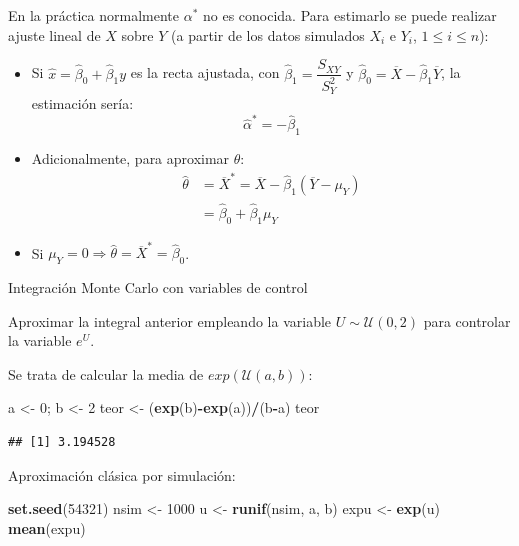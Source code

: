 \documentclass[]{book}
\newenvironment{Shaded}{\begin{snugshade}}{\end{snugshade}}
\newcommand{\KeywordTok}[1]{\textcolor[rgb]{0.13,0.29,0.53}{\textbf{#1}}}
\newcommand{\DecValTok}[1]{\textcolor[rgb]{0.00,0.00,0.81}{#1}}
\newcommand{\StringTok}[1]{\textcolor[rgb]{0.31,0.60,0.02}{#1}}
\newcommand{\OperatorTok}[1]{\textcolor[rgb]{0.81,0.36,0.00}{\textbf{#1}}}
\newcommand{\NormalTok}[1]{#1}
\theoremstyle{definition}
\theoremstyle{definition}
\theoremstyle{definition}
\theoremstyle{remark}
\let\BeginKnitrBlock\begin \let\EndKnitrBlock\end
\begin{document}
En la práctica normalmente \(\alpha^{\ast}\) no es conocida. Para
estimarlo se puede realizar ajuste lineal de \(X\) sobre \(Y\) (a partir
de los datos simulados \(X_{i}\) e \(Y_{i}\), \(1\leq i\leq n\)):

\begin{itemize}
\item
  Si \(\hat{x}=\hat{\beta}_{0}+\hat{\beta}_{1}y\) es la recta ajustada,
  con \(\hat{\beta}_{1} = \dfrac{S_{XY}}{S_{Y}^{2}}\) y
  \(\hat{\beta}_{0} = \overline{X}-\hat{\beta}_{1}\overline{Y}\), la
  estimación sería: \[\hat{\alpha}^{\ast}=-\hat{\beta}_{1}\]
\item
  Adicionalmente, para aproximar \(\theta\): \[\begin{aligned}
  \hat{\theta} & =\overline{X}^{\ast}=\overline{X}-\hat{\beta}_{1}\left( \overline{Y}-\mu_{Y}\right) \\  
  & =\hat{\beta}_{0}+\hat{\beta}_{1}\mu_{Y}
  \end{aligned}\]
\item
  Si
  \(\mu_{Y}=0\Rightarrow \hat{\theta}=\overline{X}^{\ast}=\hat{\beta}_{0}\).
\end{itemize}

\BeginKnitrBlock{exercise}
\protect\hypertarget{exr:unnamed-chunk-14}{}{\label{exr:unnamed-chunk-14}
}Integración Monte Carlo con variables de control
\EndKnitrBlock{exercise}

Aproximar la integral anterior empleando la variable
\(U\sim\mathcal{U}(0,2)\) para controlar la variable \(e^{U}\).

Se trata de calcular la media de \(exp(\mathcal{U}(a,b))\):

\begin{Shaded}
\begin{Highlighting}[]
\NormalTok{a <-}\StringTok{ }\DecValTok{0}\NormalTok{; b <-}\StringTok{ }\DecValTok{2}
\NormalTok{teor <-}\StringTok{ }\NormalTok{(}\KeywordTok{exp}\NormalTok{(b)}\OperatorTok{-}\KeywordTok{exp}\NormalTok{(a))}\OperatorTok{/}\NormalTok{(b}\OperatorTok{-}\NormalTok{a)}
\NormalTok{teor}
\end{Highlighting}
\end{Shaded}

\begin{verbatim}
## [1] 3.194528
\end{verbatim}

Aproximación clásica por simulación:

\begin{Shaded}
\begin{Highlighting}[]
\KeywordTok{set.seed}\NormalTok{(}\DecValTok{54321}\NormalTok{)}
\NormalTok{nsim <-}\StringTok{ }\DecValTok{1000}
\NormalTok{u <-}\StringTok{ }\KeywordTok{runif}\NormalTok{(nsim, a, b)}
\NormalTok{expu <-}\StringTok{ }\KeywordTok{exp}\NormalTok{(u)}
\KeywordTok{mean}\NormalTok{(expu) }
\end{Highlighting}
\end{Shaded}
\end{document}
